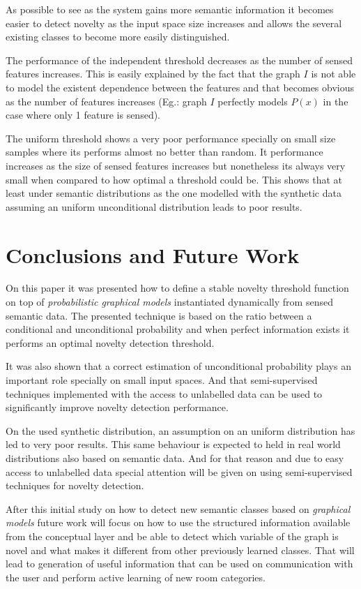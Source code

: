 \documentclass[runningheads,a4paper]{llncs}
\begin{document}
As possible to see as the system gains more semantic information it becomes easier
to detect novelty as the input space size increases and allows the several existing
classes to become more easily distinguished.

The performance of the independent threshold decreases as the number of sensed
features increases. This is easily explained by the fact that the graph $I$ is not
able to model the existent dependence between the features and that becomes obvious
as the number of features increases (Eg.: graph $I$ perfectly models $P(x)$ in the
case where only 1 feature is sensed).

The uniform threshold shows a very poor performance specially on small size samples
where its performs almost no better than random.
It performance increases as the size of sensed features increases but nonetheless
its always very small when compared to how optimal a threshold could be.
This shows that at least under semantic distributions as the one modelled with the
synthetic data assuming an uniform unconditional distribution leads to poor results.


\section{Conclusions and Future Work}
On this paper it was presented how to define a stable novelty threshold function on
top of \emph{probabilistic graphical models} instantiated dynamically from sensed
semantic data.
The presented technique is based on the ratio between a conditional and
unconditional probability and when perfect information exists it performs an optimal
novelty detection threshold.

It was also shown that a correct estimation of unconditional probability plays an
important role specially on small input spaces. And that semi-supervised techniques
implemented with the access to unlabelled data can be used to significantly improve
novelty detection performance.

On the used synthetic distribution, an assumption on an uniform
distribution has led to very poor results. This same behaviour is expected to held
in real world distributions also based on semantic data. And for that reason
and due to easy access to unlabelled data special attention will be given on using
semi-supervised techniques for novelty detection.

After this initial study on how to detect new semantic classes based on
\emph{graphical models} future work will focus on how to use the structured
information available from the conceptual layer and be able to detect which variable
of the graph is novel and what makes it different from other previously learned
classes. That will lead to generation of useful information that can be used on
communication with the user and perform active learning of new room categories.




\end{document}
